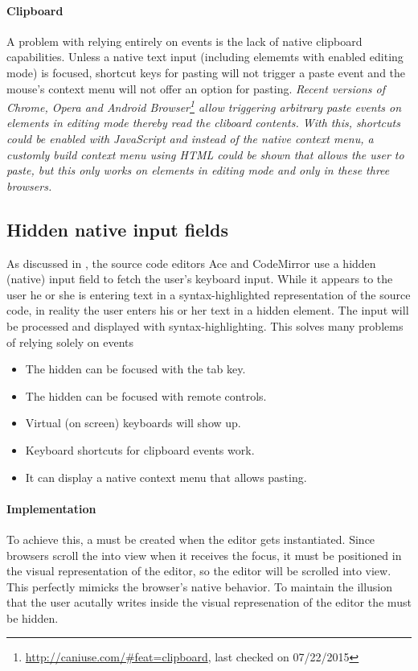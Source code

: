 \paragraph{Clipboard} A problem with relying entirely on events is the lack of native clipboard capabilities. Unless a native text input (including elememts with enabled editing mode) is focused, shortcut keys for pasting will not trigger a paste event and the mouse's context menu will not offer an option for pasting. \textit{Recent versions of Chrome, Opera and Android Browser\footnote{\url{http://caniuse.com/\#feat=clipboard}, last checked on 07/22/2015} allow triggering arbitrary paste events on elements in editing mode thereby read the cliboard contents. With this, shortcuts could be enabled with JavaScript and instead of the native context menu, a customly build context menu using HTML could be shown that allows the user to paste, but this only works on elements in editing mode and only in these three browsers.}

\subsection{Hidden native input fields} 

As discussed in , the source code editors Ace and CodeMirror use a hidden (native) input field to fetch the user's keyboard input. While it appears to the user he or she is entering text in a syntax-highlighted representation of the source code, in reality the user enters his or her text in a hidden  element. The input will be processed and displayed with syntax-highlighting. This solves many problems of relying solely on events

\begin{itemize}
\item The hidden  can be focused with the tab key.
\item The hidden  can be focused with remote controls.
\item Virtual (on screen) keyboards will show up.
\item Keyboard shortcuts for clipboard events work.
\item It can display a native context menu that allows pasting.
\end{itemize}

\paragraph{Implementation} To achieve this, a  must be created when the editor gets instantiated. Since browsers scroll the  into view when it receives the focus, it must be positioned in the visual representation of the editor, so the editor will be scrolled into view. This perfectly mimicks the browser's native behavior. To maintain the illusion that the user acutally writes inside the visual represenation of the editor the  must be hidden.

